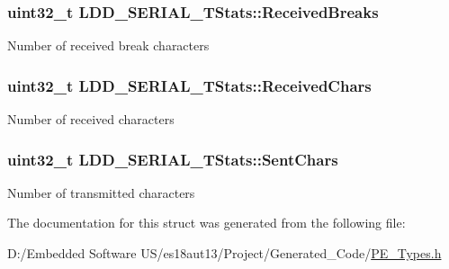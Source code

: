 \subsubsection[{Received\+Breaks}]{\setlength{\rightskip}{0pt plus 5cm}uint32\+\_\+t L\+D\+D\+\_\+\+S\+E\+R\+I\+A\+L\+\_\+\+T\+Stats\+::\+Received\+Breaks}\label{struct_l_d_d___s_e_r_i_a_l___t_stats_a45f707461666b974a6c3b5c948e66cf7}
Number of received break characters \hypertarget{struct_l_d_d___s_e_r_i_a_l___t_stats_a7dd5faa8bc6c15fde011eb6192ca6168}{}
\subsubsection[{Received\+Chars}]{\setlength{\rightskip}{0pt plus 5cm}uint32\+\_\+t L\+D\+D\+\_\+\+S\+E\+R\+I\+A\+L\+\_\+\+T\+Stats\+::\+Received\+Chars}\label{struct_l_d_d___s_e_r_i_a_l___t_stats_a7dd5faa8bc6c15fde011eb6192ca6168}
Number of received characters \hypertarget{struct_l_d_d___s_e_r_i_a_l___t_stats_a60198f844b85f9e73efaca83e32471cd}{}
\subsubsection[{Sent\+Chars}]{\setlength{\rightskip}{0pt plus 5cm}uint32\+\_\+t L\+D\+D\+\_\+\+S\+E\+R\+I\+A\+L\+\_\+\+T\+Stats\+::\+Sent\+Chars}\label{struct_l_d_d___s_e_r_i_a_l___t_stats_a60198f844b85f9e73efaca83e32471cd}
Number of transmitted characters 

The documentation for this struct was generated from the following file\+:\begin{DoxyCompactItemize}
\item 
D\+:/\+Embedded Software U\+S/es18aut13/\+Project/\+Generated\+\_\+\+Code/\hyperlink{_p_e___types_8h}{P\+E\+\_\+\+Types.\+h}\end{DoxyCompactItemize}
